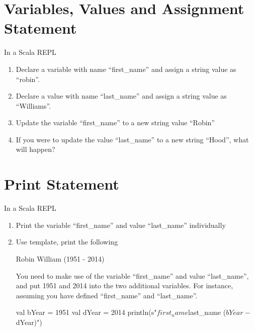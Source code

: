 \documentclass[10pt]{article}
\newcommand{\comment}[1]{}
\begin{document}
\section{Variables, Values and Assignment Statement}
In a Scala REPL
\begin{enumerate}
\item Declare a variable with name ``first\_name'' and assign a string
  value as ``robin''.
\item Declare a value with name ``last\_name'' and assign a string
  value as ``Williams''.
\item Update the variable ``first\_name'' to a new string value
  ``Robin''
\item If you were to update the value ``last\_name'' to a new string
  ``Hood'', what will happen?
\end{enumerate}
\comment{
\subsection{Sample Answer}
\begin{code}
scala> var first_name = "robin"
first_name: String = robin

scala> val last_name = "Williams"
last_name: String = Williams

scala> first_name = "Robin"
first_name: String = Robin

scala> last_name = "Hood"
<console>:12: error: reassignment to val
       last_name = "Hood"
                 ^
\end{code}
}
\section{Print Statement}
In a Scala REPL
\begin{enumerate}
\item Print the variable ``first\_name'' and value ``last\_name'' individually
\item Use template, print the following
\begin{code}
Robin William (1951 - 2014) 
\end{code}
You need to make use of the variable ``first\_name'' and value ``last\_name'',
and put 1951 and 2014 into the two additional variables. For instance,
assuming you have defined ``first\_name'' and ``last\_name''.
\begin{code}
val bYear = 1951
val dYear = 2014
println(s"$first_name $last_name ($bYear - $dYear)")
\end{code}

\end{enumerate}
\comment{
\subsection{Sample Answer}
\begin{code}
scala>  val bYear = 1951
bYear: Int = 1951

scala>  val dYear = 2014
dYear: Int = 2014

scala> println(s"$first_name $last_name ($bYear - $dYear)")
Robin Williams (1951 - 2014)
\end{code}
}
\end{document}
